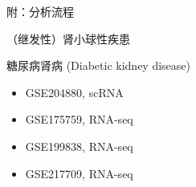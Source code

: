 \documentclass[
  ignorenonframetext,
]{beamer}
\providecommand{\tightlist}{%
  \setlength{\itemsep}{0pt}\setlength{\parskip}{0pt}}
\begin{document}
\begin{frame}[fragile]{附：分析流程}
\begin{block}{（继发性）肾小球性疾患}
\protect\hypertarget{ux7ee7ux53d1ux6027ux80beux5c0fux7403ux6027ux75beux60a3}{}
\begin{block}{糖尿病肾病 (Diabetic kidney disease)}
\protect\hypertarget{ux7cd6ux5c3fux75c5ux80beux75c5-diabetic-kidney-disease}{}
\begin{itemize}
\tightlist
\item
  GSE204880, scRNA
\item
  GSE175759, RNA-seq
\item
  GSE199838, RNA-seq
\item
  GSE217709, RNA-seq
\end{itemize}
\end{block}
\end{block}
\end{frame}
\end{document}
